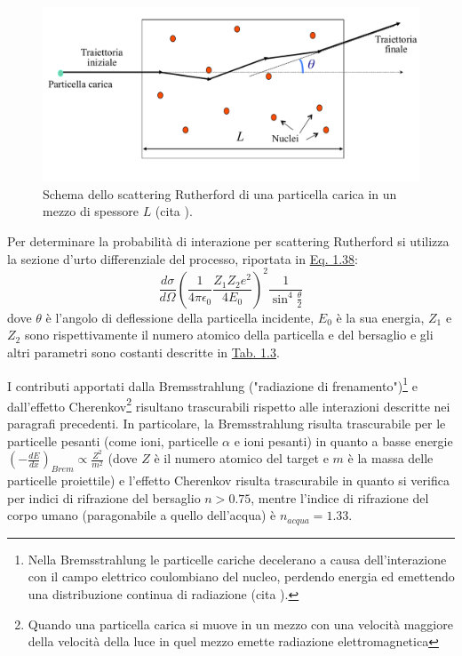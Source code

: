 \documentclass[12pt,a4paper,twoside]{report}
\begin{document}
	\begin{figure}[H]
		\centering
		\includegraphics[width=0.9\linewidth]{rutherford_scattering.pdf}
		\caption{Schema dello scattering Rutherford di una particella carica in un mezzo di spessore $L$ (cita
			).}
		\label{fig:rutherford_scattering}
	\end{figure}

	Per determinare la probabilità di interazione per scattering Rutherford si utilizza la sezione d'urto differenziale del processo, riportata in \hyperref[eq:rutherford_scattering]{Eq. 1.38}:
	\begin{equation}
		\frac{d\sigma}{d\Omega}\left(\frac{1}{4\pi\epsilon_0}\frac{Z_1Z_2e^2}{4E_0}\right)^2\frac{1}{\sin^4{\frac{\theta}{2}}}
		\label{eq:rutherford_scattering}
	\end{equation}
	dove $\theta$ è l'angolo di deflessione della particella incidente, $E_0$ è la sua energia, $Z_1$ e $Z_2$ sono rispettivamente il numero atomico della particella e del bersaglio e gli altri parametri sono costanti descritte in \hyperref[tab:bethe_bloch]{Tab. 1.3}.
	
	I contributi apportati dalla Bremsstrahlung ("radiazione di frenamento")\footnote{Nella Bremsstrahlung le particelle cariche decelerano a causa dell'interazione con il campo elettrico coulombiano del nucleo, perdendo energia ed emettendo una distribuzione continua di radiazione (cita
		).} e dall'effetto Cherenkov\footnote{Quando una particella carica si muove in un mezzo con una velocità maggiore della velocità della luce in quel mezzo emette radiazione elettromagnetica} risultano trascurabili rispetto alle interazioni descritte nei paragrafi precedenti. In particolare, la Bremsstrahlung risulta trascurabile per le particelle pesanti (come ioni, particelle $\alpha$ e ioni pesanti) in quanto a basse energie $\left(-\frac{dE}{dx}\right)_{Brem}\propto\frac{Z^2}{m^2}$ (dove $Z$ è il numero atomico del target e $m$ è la massa delle particelle proiettile) e l'effetto Cherenkov risulta trascurabile in quanto si verifica per indici di rifrazione del bersaglio $n>0.75$, mentre l'indice di rifrazione del corpo umano (paragonabile a quello dell'acqua) è $n_{acqua}=1.33$.
	
\end{document}
